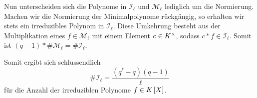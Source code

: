 \begin{exercisePage}
	Nun unterscheiden sich die Polynome in $\mathcal{I}_\ell$ und $\mathcal{M}_\ell$ lediglich um die Normierung. Machen wir die Normierung der Minimalpolynome rückgängig, so erhalten wir stets ein irreduzibles Polynom in $\mathcal{I}_\ell$. Diese Umkehrung besteht aus der Multiplikation eines $f \in  \mathcal{M}_\ell$ mit einem Element $c \in {K}^{\times}$, sodass $c * f \in \mathcal{I}_\ell$. Somit ist $(q-1) * \# \mathcal{M}_\ell = \# \mathcal{I}_\ell$. 
	
	Somit ergibt sich schlussendlich
	\begin{equation*}
		\# \mathcal{I}_\ell = \frac{(q^\ell - q) (q-1)}{\ell}
	\end{equation*}
	für die Anzahl der irreduziblen Polynome $f \in \polynom[K][X]$.
\end{exercisePage}